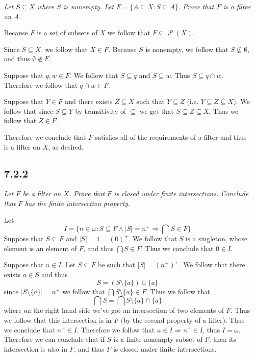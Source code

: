\documentclass[11pt,oneside,titlepage]{book}
\DeclareMathOperator \pow {\mathcal {P}}
\DeclareMathOperator \ra {\Rightarrow}
\newcommand{\set}[1]{\{ #1 \}}
\begin{document}
\textit{Let $S \subseteq X$ where $S$ is nonempty. Let $F = \set{A \subseteq X: S \subseteq A}$.
  Prove that $F$ is a filter on $A$.}

Because $F$ is a set of subsets of $X$ we follow that $F \subseteq \pow(X)$. 

Since $S \subseteq X$, we follow that $X \in F$. Because $S$ is nonempty, we follow that
$S \not \subseteq \emptyset$, and thus $\emptyset \notin F$.

Suppose that $q, w \in F$. We follow that $S \subseteq q$ and $S \subseteq w$. Thus
$S \subseteq q \cap w$. Therefore we follow that $q \cap w \in F$.

Suppose that $Y \in F$ and there exists $Z \subseteq X$ such that $Y \subseteq Z$
(i.e. $Y \subseteq Z \subseteq X$). We follow that since $S \subseteq Y$ by
transitivity of $\subseteq$ we get that $S \subseteq Z \subseteq X$. Thus we follow that
$Z \in F$.

Therefore we conclude that $F$ satisfies all of the requirements of a filter and thus is a
filter on $X$, as desired.

\subsection*{7.2.2}

\textit{Let $F$ be a filter on $X$. Prove that $F$ is closed under finite intersections.
  Conclude that $F$ has the finite intersection property.}

Let
$$I = \set{n \in \omega: S \subseteq F \land |S| = n^+ \ra \bigcap{S} \in F}$$
Suppose that $S \subseteq F$ and $|S| = 1 = (0)^+$. We follow that $S$ is a singleton,
whose element is an element of $F$, and thus $\bigcap{S} \in F$. Thus we conclude that
$0 \in I$.

Suppose that $n \in I$. Let $S \subseteq F$ be such that $|S| = (n^+)^+$.
We follow that there exists $a \in S$ and thus
$$S = (S \setminus \set{a}) \cup \set{a}$$
since $|S \setminus \set{a}| = n^+$ we follow that $\bigcap{S \setminus \set{a}} \in F$.
Thus we follow that
$$\bigcap{S} = \bigcap{S \setminus \set{a}} \cap \set{a}$$
where on the right hand side we've got an intersection of two elements of $F$. Thus we
follow that this intersection is in $F$ (by the second property of a filter). Thus we
conclude that $n^+ \in I$. Therefore we follow that $n \in I \ra n^+ \in I$, thus
$I = \omega$. Therefore we can conclude that if $S$ is a finite nonempty subset of $F$,
then its intersection is also in $F$, and thus $F$ is closed under finite intersections.
\end{document}
